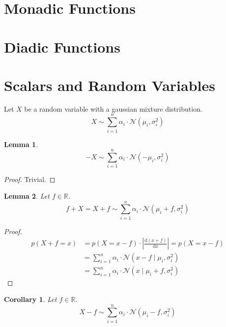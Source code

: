 \documentclass[11pt,a4paper]{book}
\newtheorem{lemma}{Lemma}
\newtheorem{corollary}{Corollary}
\begin{document}
\section{Monadic Functions}

\section{Diadic Functions}

\section{Scalars and Random Variables}

Let $X$ be a random variable with a gaussian mixture distribution.
\begin{equation*}
  X \sim \sum_{i = 1}^{n} \alpha_{i} \cdot \mathcal{N}(\mu_{i}, \sigma_{i}^{2})
\end{equation*}

\begin{lemma}
  \begin{equation*}
    -X \sim \sum_{i = 1}^{n} \alpha_{i} \cdot \mathcal{N}(-\mu_{i}, \sigma_{i}^{2})
  \end{equation*}
\end{lemma}

\begin{proof}
  Trivial.
\end{proof}

\begin{lemma}
  Let $f \in \mathbb{R}$.
  \begin{equation*}
    f + X = X + f \sim \sum_{i = 1}^{n} \alpha_{i} \cdot \mathcal{N}(\mu_{i} + f, \sigma_{i}^{2})
  \end{equation*}
\end{lemma}

\begin{proof}
  \begin{align*}
    p(X + f = x) & = p(X = x - f) \cdot \left| \frac{\mathrm{d}(x + f)}{\mathrm{d}x} \right| = p(X = x - f)\\
                 & = \sum_{i = 1}^{n} \alpha_{i} \cdot \mathcal{N}(x - f \mid \mu_{i}, \sigma_{i}^{2})\\
                 & = \sum_{i = 1}^{n} \alpha_{i} \cdot \mathcal{N}(x \mid \mu_{i} + f, \sigma_{i}^{2})
  \end{align*}
\end{proof}

\begin{corollary}
  Let $f \in \mathbb{R}$.
  \begin{equation*}
    X - f \sim \sum_{i = 1}^{n} \alpha_{i} \cdot \mathcal{N}(\mu_{i} - f, \sigma_{i}^{2})
  \end{equation*}
\end{corollary}
\end{document}
